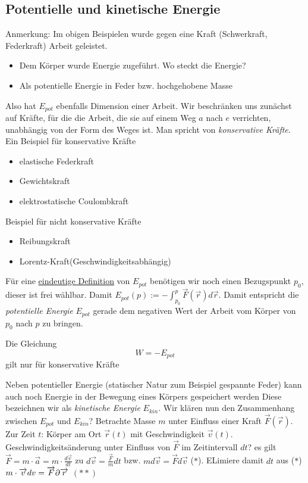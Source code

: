 \documentclass[a4paper,10pt]{scrartcl}
\begin{document}
\subsection{Potentielle und kinetische Energie}
Anmerkung: Im obigen Beispielen wurde gegen eine Kraft (Schwerkraft, Federkraft) Arbeit geleistet.
\begin{itemize}
 \item Dem Körper wurde Energie zugeführt. Wo steckt die Energie?
 \item Als potentielle Energie in Feder bzw. hochgehobene Masse
\end{itemize}
Also hat $E_{pot}$ ebenfalls Dimension einer Arbeit. Wir beschränken uns zunächst auf Kräfte, für die die Arbeit, die sie auf einem Weg $a$ nach $e$ verrichten, 
unabhängig von der Form des Weges ist. Man spricht von \emph{konservative Kräfte}.\\
Ein Beispiel für konservative Kräfte\\
\begin{itemize}
 \item elastische Federkraft
 \item Gewichtskraft
 \item elektrostatische Coulombkraft
\end{itemize}
Beispiel für nicht  konservative Kräfte\\
\begin{itemize}
 \item Reibungskraft
 \item Lorentz-Kraft(Geschwindigkeitsabhängig)
\end{itemize}
Für eine \underline{eindeutige Definition} von $E_{pot}$ benötigen wir noch einen Bezugspunkt $p_0$, dieser ist frei wählbar.
Damit $E_{pot}(p):= -\int_{p_0}^{p} \vec F(\vec r)d\vec{r}$.
Damit entspricht die \emph{potentielle Energie} $E_{pot}$ gerade dem negativen Wert der Arbeit vom Körper von $p_0$ nach $p$ zu bringen.
\begin{att*}
 Die Gleichung
\[
 \boxed{W=-E_{pot}}
\]
gilt nur für konservative Kräfte
\end{att*}
Neben potentieller Energie (statischer Natur zum Beispiel gespannte Feder) kann auch noch Energie in der Bewegung eines Körpers gespeichert werden
Diese bezeichnen wir als \emph{kinetische Energie} $E_{kin}$. Wir klären nun den Zusammenhang zwischen $E_{pot}$ und $E_{kin}$?
Betrachte Masse $m$ unter Einfluss einer Kraft $\vec F(\vec r)$.\\
Zur Zeit $t$: Körper am Ort $\vec r(t)$ mit Geschwindigkeit $\vec v(t)$.
Geschwindigkeitsänderung unter Einfluss von $\vec F$ im Zeitintervall $dt$?
es gilt $\vec F=m\cdot \vec a=m\cdot \frac{d\vec{v}}{dt}$ zu $d\vec{v}=\frac{\vec F}{m} dt$ 
bzw. $md\vec v=\vec F d\vec{v}$ ($*$). ELimiere damit $dt$ aus ($*$) $m\cdot \overrightarrow{v} dv=\overrightarrow{F}\partial\overrightarrow{r}$ $(**)$
\end{document}
